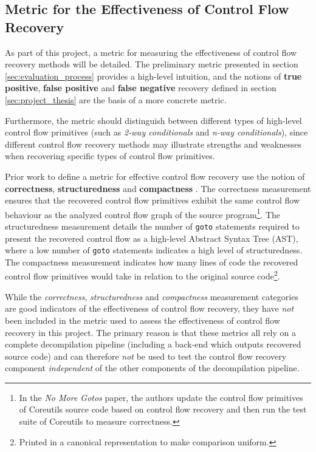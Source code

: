 
\subsection{Metric for the Effectiveness of Control Flow Recovery}
\label{sec:requirements_metric}

As part of this project, a metric for measuring the effectiveness of control flow recovery methods will be detailed. The preliminary metric presented in section \ref{sec:evaluation_process} provides a high-level intuition, and the notions of \textbf{true positive}, \textbf{false positive} and \textbf{false negative} recovery defined in section \ref{sec:project_thesis} are the basis of a more concrete metric.

Furthermore, the metric should distinguish between different types of high-level control flow primitives (such as \textit{2-way conditionals} and \textit{n-way conditionals}), since different control flow recovery methods may illustrate strengths and weaknesses when recovering specific types of control flow primitives.

Prior work to define a metric for effective control flow recovery use the notion of \textbf{correctness}, \textbf{structuredness} and \textbf{compactness} \cite{no_more_gotos}. The correctness measurement ensures that the recovered control flow primitives exhibit the same control flow behaviour as the analyzed control flow graph of the source program\footnote{In the \textit{No More Gotos} paper, the authors update the control flow primitives of Coreutils source code based on control flow recovery and then run the test suite of Coreutils to measure correctness.}. The structuredness measurement details the number of \texttt{goto} statements required to present the recovered control flow as a high-level Abstract Syntax Tree (AST), where a low number of \texttt{goto} statements indicates a high level of structuredness. The compactness measurement indicates how many lines of code the recovered control flow primitives would take in relation to the original source code\footnote{Printed in a canonical representation to make comparison uniform.}.

While the \textit{correctness}, \textit{structuredness} and \textit{compactness} measurement categories are good indicators of the effectiveness of control flow recovery, they have \textit{not} been included in the metric used to assess the effectiveness of control flow recovery in this project. The primary reason is that these metrics all rely on a complete decompilation pipeline (including a back-end which outputs recovered source code) and can therefore \textit{not} be used to test the control flow recovery component \textit{independent} of the other components of the decompilation pipeline.

